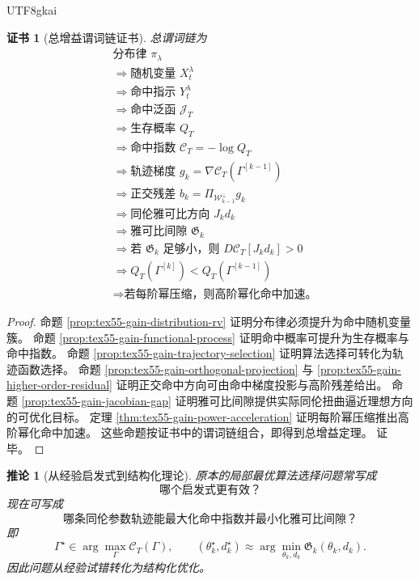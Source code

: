 \documentclass[12pt]{article}
\newtheorem{corollary}{推论}[section]
\newtheorem{Certificate}{证书}[section]
\begin{document}
\begin{CJK*}{UTF8}{gkai}
\begin{Certificate}[总增益谓词链证书]
\label{cert:tex55-overall-gain-theorem}
总谓词链为
\[
\begin{aligned}
  &\text{分布律 }\pi_\lambda\\
  &\Longrightarrow
  \text{随机变量 }X_t^\lambda\\
  &\Longrightarrow
  \text{命中指示 }Y_t^\lambda\\
  &\Longrightarrow
  \text{命中泛函 }\mathcal J_T\\
  &\Longrightarrow
  \text{生存概率 }Q_T\\
  &\Longrightarrow
  \text{命中指数 }\mathcal C_T=-\log Q_T\\
  &\Longrightarrow
  \text{轨迹梯度 }g_k=\nabla\mathcal C_T(\Gamma^{[k-1]})\\
  &\Longrightarrow
  \text{正交残差 }b_k=\Pi_{\mathcal W_{k-1}^\perp}g_k\\
  &\Longrightarrow
  \text{同伦雅可比方向 }J_kd_k\\
  &\Longrightarrow
  \text{雅可比间隙 }\mathfrak G_k\\
  &\Longrightarrow
  \text{若 }\mathfrak G_k\text{ 足够小，则 }D\mathcal C_T[J_kd_k]>0\\
  &\Longrightarrow
  Q_T(\Gamma^{[k]})<Q_T(\Gamma^{[k-1]})\\
  &\Longrightarrow
  \text{若每阶幂压缩，则高阶幂化命中加速。}
\end{aligned}
\]
\end{Certificate}

\begin{proof}
命题 \ref{prop:tex55-gain-distribution-rv} 证明分布律必须提升为命中随机变量簇。
命题 \ref{prop:tex55-gain-functional-process} 证明命中概率可提升为生存概率与命中指数。
命题 \ref{prop:tex55-gain-trajectory-selection} 证明算法选择可转化为轨迹函数选择。
命题 \ref{prop:tex55-gain-orthogonal-projection} 与
\ref{prop:tex55-gain-higher-order-residual} 证明正交命中方向可由命中梯度投影与高阶残差给出。
命题 \ref{prop:tex55-gain-jacobian-gap} 证明雅可比间隙提供实际同伦扭曲逼近理想方向的可优化目标。
定理 \ref{thm:tex55-gain-power-acceleration} 证明每阶幂压缩推出高阶幂化命中加速。
这些命题按证书中的谓词链组合，即得到总增益定理。
证毕。
\end{proof}

\begin{corollary}[从经验启发式到结构化理论]
\label{cor:tex55-gain-heuristic-to-structure}
原本的局部最优算法选择问题常写成
\[
  \text{哪个启发式更有效？}
\]
现在可写成
\[
  \text{哪条同伦参数轨迹能最大化命中指数并最小化雅可比间隙？}
\]
即
\[
  \Gamma^\star\in\arg\max_{\Gamma}\mathcal C_T(\Gamma),
  \qquad
  (\theta_k^\star,d_k^\star)
  \approx
  \arg\min_{\theta_k,d_k}\mathfrak G_k(\theta_k,d_k).
\]
因此问题从经验试错转化为结构化优化。
\end{corollary}


\end{CJK*}
\end{document}
